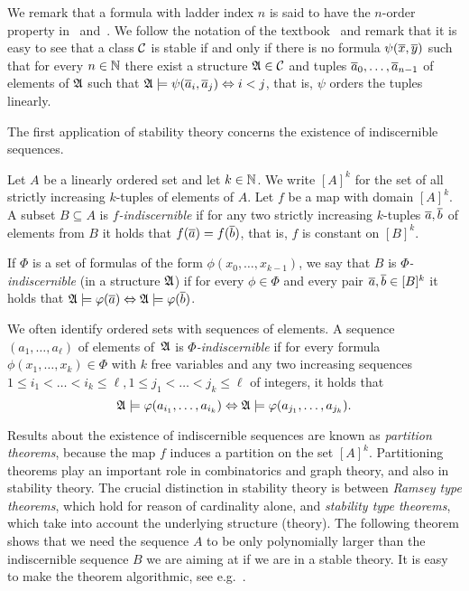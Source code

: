 We remark that a formula with ladder index $n$ is said to have the
$n$-order property in~\cite{adler2014interpreting} and~\cite{ensley1996finite}.
We follow the notation of the textbook~\cite{hodges1993model} and remark
that it is easy to see that a class $\mathcal{C}$ is stable if and only if there is no 
formula $\psi(\overline{x},\overline{y})$ such that for every $n\in \mathbb{N}$
there exist a structure $\mathfrak{A}\in \mathcal{C}$ and tuples $\overline{a}_0,\ldots, \overline{a}_{n-1}$
of elements of $\mathfrak{A}$ such that $\mathfrak{A}\models\psi(\overline{a}_i,\overline{a}_j)\Leftrightarrow i<j$,
that is, $\psi$ orders the tuples linearly. 

The first application of stability theory concerns the existence of indiscernible sequences. 

\begin{definition}
Let $A$ be a linearly ordered set and let $k\in \mathbb{N}$. We write $[A]^k$ for the set
of all strictly increasing $k$-tuples of elements of $A$. Let $f$ be a map with
domain $[A]^k$. A subset $B\subseteq A$ is \emph{$f$-indiscernible} if for
any two strictly increasing $k$-tuples $\overline{a},\overline{b}$ of elements from $B$
it holds that $f(\overline{a})=f(\overline{b})$, that is, $f$ is constant on $[B]^k$. 

If $\Phi$ is a set of formulas of the form $\phi(x_0,\ldots, x_{k-1})$, 
we say that $B$ is \emph{$\Phi$-indiscernible} (in a structure $\mathfrak{A}$)
if for every $\phi\in \Phi$ and every pair $\overline{a},\overline{b}\in [B]^k$ it
holds that $\mathfrak{A}\models\varphi(\overline{a})\Leftrightarrow\mathfrak{A}\models\varphi(\overline{b})$. 
\end{definition}

We often identify ordered sets with sequences of elements. 
A sequence $(a_1,\ldots, a_\ell)$ of elements of~$\mathfrak{A}$ is
\emph{$\Phi$-indiscernible} if for every formula
$\phi(x_1,\ldots, x_k)\in \Phi$ with $k$ free variables and any two
increasing sequences
$1\leq i_1<\ldots <i_k\leq \ell, 1\leq j_1< \ldots< j_k\leq \ell$ of
integers, it holds that
\[\mathfrak{A}\models\varphi(a_{i_1},\ldots, a_{i_k})\Leftrightarrow \mathfrak{A}\models\varphi(a_{j_1},
\ldots, a_{j_k}).\]

Results about the existence of indiscernible sequences are known as 
\emph{partition theorems}, because the map $f$ induces a partition
on the set $[A]^k$. Partitioning theorems play an important role in 
combinatorics and graph theory, and also in stability theory. The 
crucial distinction in stability theory is between \emph{Ramsey type 
theorems}, which hold
for reason of cardinality alone, and \emph{stability type theorems},
which take into account the underlying structure (theory). The following
theorem shows that we need the sequence $A$ to be only polynomially larger
than the indiscernible sequence $B$ we are aiming at if we are in a stable theory. 
It is easy to make the theorem algorithmic, see 
e.g.~\cite{siebertz2016polynomial}. 


